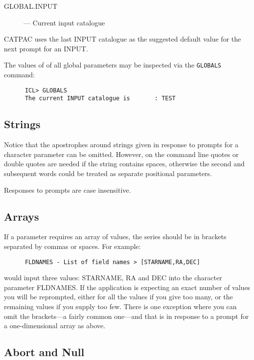 \begin{description}
\begin{description}
\item [GLOBAL.INPUT] --- Current input catalogue
\end{description}
\end{description}

{\small CATPAC} uses the last INPUT catalogue as the
suggested default value for the next prompt for an INPUT. 

The values of of all global parameters may be inspected via the
{\tt GLOBALS} command:
\begin{verbatim}
      ICL> GLOBALS
      The current INPUT catalogue is       : TEST
\end{verbatim}

\subsection{Strings}
\label{se:parstring}
Notice that the apostrophes around strings given in response to prompts
for a character parameter can be omitted. However, on the command
line quotes or double quotes are needed if the string contains spaces,
otherwise the second and subsequent words could be treated as
separate positional parameters.

Responses to prompts are case insensitive. 

\subsection{Arrays}
If a parameter requires an array of values, the series
should be in brackets separated by commas or spaces.  For example:
\begin{verbatim}
      FLDNAMES - List of field names > [STARNAME,RA,DEC]
\end{verbatim}
would input three values: STARNAME, RA and DEC into the character parameter
FLDNAMES.  If the application is expecting an exact number of values
you will be reprompted, either for all the values if you give too many,
or the remaining values if you supply too few.  There is one exception
where you can omit the brackets---a fairly common one---and that is in
response to a prompt for a one-dimensional array as above.

\subsection{Abort and Null}

